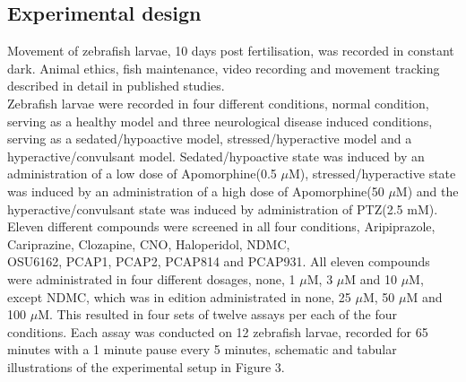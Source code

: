 \documentclass[a4paper,12pt]{article}
\begin{document}
\subsection{Experimental design}
Movement of zebrafish larvae, 10 days post fertilisation, was recorded in constant dark. Animal ethics, fish maintenance, video recording and movement tracking described in detail in published studies\cite{ref17}\cite{ref18}. \\Zebrafish larvae were recorded in four different conditions, normal condition, serving as a healthy model and three neurological disease induced conditions, serving as a sedated/hypoactive model, stressed/hyperactive model and a hyperactive/convulsant model. Sedated/hypoactive state was induced by an administration of a low dose of Apomorphine(0.5 $\mu$M), stressed/hyperactive state was induced by an administration of a high dose of Apomorphine(50 $\mu$M) and the hyperactive/convulsant state was induced by administration of PTZ(2.5 mM). Eleven different compounds were screened in all four conditions, Aripiprazole\cite{ref25}, Cariprazine\cite{ref26}, Clozapine\cite{ref27}, CNO\cite{ref28}, Haloperidol\cite{ref29}, NDMC\cite{ref30},\\OSU6162\cite{ref31}, PCAP1\cite{ref32}, PCAP2\cite{ref32}, PCAP814 and PCAP931. All eleven compounds were administrated in four different dosages, none, 1 $\mu$M, 3 $\mu$M and 10 $\mu$M, except NDMC, which was in edition administrated in none, 25 $\mu$M, 50 $\mu$M and 100 $\mu$M. This resulted in four sets of twelve assays per each of the four conditions.
Each assay was conducted on 12 zebrafish larvae, recorded for 65 minutes with a 1 minute pause every 5 minutes, schematic and tabular illustrations of the experimental setup in Figure 3.
\end{document}
